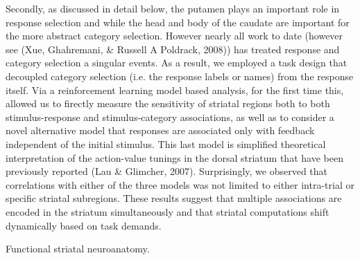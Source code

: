 Secondly, as discussed in detail below, the putamen plays an important role in response selection and while the head and body of the caudate are important for the more abstract category selection.  However nearly all work to date (however see (Xue, Ghahremani, & Russell A Poldrack, 2008)) has treated response and category selection a singular events.  As a result, we employed a task design that decoupled category selection (i.e. the response labels or names) from the response itself.  Via a reinforcement learning model based analysis, for the first time this, allowed us to firectly measure the sensitivity of striatal regions both to both stimulus-response and stimulus-category associations, as well as to consider a novel alternative model that responses are associated only with feedback independent of the initial stimulus.  This last model is simplified theoretical interpretation of the action-value tunings in the dorsal striatum that have been previously reported (Lau & Glimcher, 2007).  Surprisingly, we observed that correlations with either of the three models was not limited to either intra-trial or specific striatal subregions.  These results suggest that multiple associations are encoded in the striatum simultaneously and that striatal computations shift dynamically based on task demands.

		

Functional striatal neuroanatomy.  

